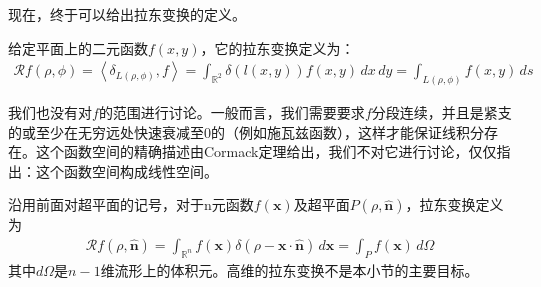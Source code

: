 现在，终于可以给出拉东变换的定义。
\begin{definition}[拉东变换]
    给定平面上的二元函数$f(x,y)$，它的拉东变换定义为：
    \begin{align*}
    \mathcal{R} f(\rho,\phi)=\left\langle \delta_{L(\rho,\phi)},f\right\rangle=\int_{\mathbb{R}^2}\delta(l(x,y))f(x,y)\,dx\,dy=\int_{L(\rho,\phi)}f(x,y)\,ds
    \end{align*}
\end{definition}
\begin{remark}
    我们也没有对$f$的范围进行讨论。一般而言，我们需要要求$f$分段连续，并且是紧支的或至少在无穷远处快速衰减至0的（例如施瓦兹函数），这样才能保证线积分存在。这个函数空间的精确描述由Cormack定理给出，我们不对它进行讨论，仅仅指出：这个函数空间构成线性空间。
\end{remark}
\begin{remark}
    沿用前面对超平面的记号，对于n元函数$f(\mathbf{x})$及超平面$P(\rho,\hat{\mathbf{n}})$，拉东变换定义为
    \begin{align*}
    \mathcal{R} f(\rho,\hat{\mathbf{n}})=\int_{\mathbb{R}^n}f(\mathbf{x})\delta(\rho-\mathbf{x}\cdot\hat{\mathbf{n}})\,d\mathbf{x}=\int_{P}f(\mathbf{x})\,d\Omega
    \end{align*}
    其中$d\Omega$是$n-1$维流形上的体积元。高维的拉东变换不是本小节的主要目标。
\end{remark}


